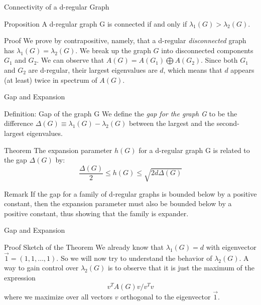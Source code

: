 \documentclass[10pt]{beamer}
\begin{document}
\begin{frame}{Connectivity of a d-regular Graph}
    \begin{block}{Proposition} A d-regular graph G is connected if and only if $\lambda_1(G) > \lambda_2(G)$.
    \end{block}
    \pause{}
    \begin{block}{Proof}
        We prove by contrapositive, namely, that a d-regular \textit{disconnected} graph has $\lambda_1(G) = \lambda_2(G)$.
        \pause{}
        We break up the graph $G$ into disconnected components $G_1$ and $G_2$. We can observe that $A(G) = A(G_1) \bigoplus A(G_2)$.
        \pause{}
        Since both $G_1$ and $G_2$ are d-regular, their largest eigenvalues are $d$, which means that $d$ appears (at least) twice in spectrum of $A(G)$.
    \end{block}
\end{frame}

\begin{frame}{Gap and Expansion}
    \begin{block}{Definition: Gap of the graph  G}
        We define the \textit{gap for the graph G} to be the difference $\Delta(G) 
        \equiv \lambda_1(G) - \lambda_2(G)$ between the largest and the second-largest eigenvalues.
    \end{block}
    \pause{}
    \begin{block}{Theorem}
        The expansion parameter $h(G)$ for a d-regular graph G is related to the gap $\Delta(G)$ by:
        $$\frac{\Delta(G)}{2} \leq h(G) \leq \sqrt{2d\Delta(G)}$$
    \end{block}
    \pause{}
    \begin{block}{Remark}
        If the gap for a family of d-regular graphs is bounded below by a positive constant, then the expansion parameter must also be bounded below by a positive constant, thus showing that the family is expander.
    \end{block}
\end{frame}

\begin{frame}[t]{Gap and Expansion}
    \begin{block}{Proof Sketch of the Theorem}
        We already know that $\lambda_1(G) = d$ with eigenvector $\vec{1} = (1,1,\ldots,1)$.
        \pause{}
        So we will now try to understand the behavior of $\lambda_2(G)$.
        \pause{}
        A way to gain control over $\lambda_2(G)$ is to observe that it is just the maximum of the expression
        $$v^TA(G)v/v^Tv$$
        where we maximize over all vectors $v$ orthogonal to the eigenvector $\vec{1}$.
    \end{block}
\end{frame}
\end{document}
